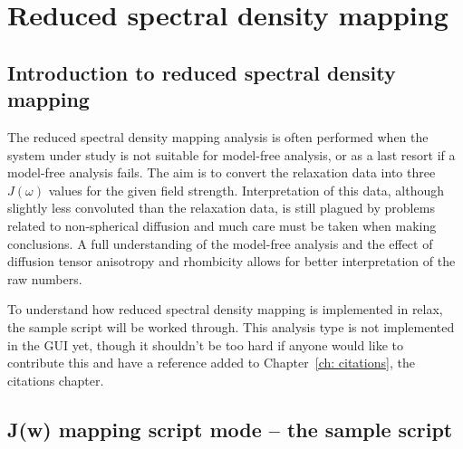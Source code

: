 
\chapter{Reduced spectral density mapping} \label{ch: J(w) mapping}


\section{Introduction to reduced spectral density mapping}

The reduced spectral density mapping analysis is often performed when the system under study is not suitable for model-free analysis, or as a last resort if a model-free analysis fails.
The aim is to convert the relaxation data into three $J(\omega)$ values for the given field strength.
Interpretation of this data, although slightly less convoluted than the relaxation data, is still plagued by problems related to non-spherical diffusion and much care must be taken when making conclusions.
A full understanding of the model-free analysis and the effect of diffusion tensor anisotropy and rhombicity allows for better interpretation of the raw numbers.

To understand how reduced spectral density mapping is implemented in relax, the sample script will be worked through.
This analysis type is not implemented in the GUI yet, though it shouldn't be too hard if anyone would like to contribute this and have a reference added to Chapter~\ref{ch: citations}, the citations chapter.



\section{J(w) mapping script mode -- the sample script}

